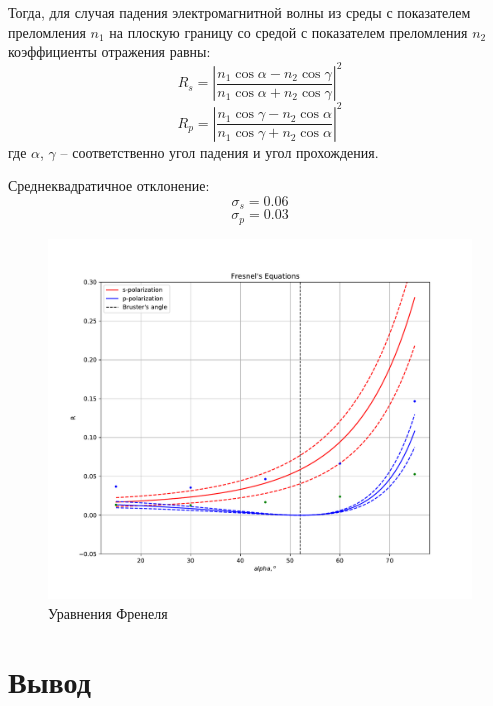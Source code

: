 \documentclass[a4paper, 12pt]{article}
\begin{document}
Тогда, для случая падения электромагнитной волны из среды с показателем преломления $n_1$ на плоскую границу со средой с показателем преломления $n_2$ коэффициенты отражения равны:
\begin{equation}
R_s = \left| \frac{n_1\cos\alpha-n_2\cos\gamma}{n_1\cos\alpha+n_2\cos\gamma} \right|^2
\end{equation}
\begin{equation}
R_p = \left| \frac{n_1\cos\gamma-n_2\cos\alpha}{n_1\cos\gamma+n_2\cos\alpha} \right|^2
\end{equation}
где $\alpha$, $\gamma$ – соответственно угол падения и угол прохождения.

Среднеквадратичное отклонение: 
\[\sigma_s = 0.06\]
\[\sigma_p = 0.03\]
\begin{figure}[H]
	\centering
	\includegraphics[scale=0.7]{frenel}
	\caption{Уравнения Френеля}
\end{figure}


\section{Вывод}
\end{document}

